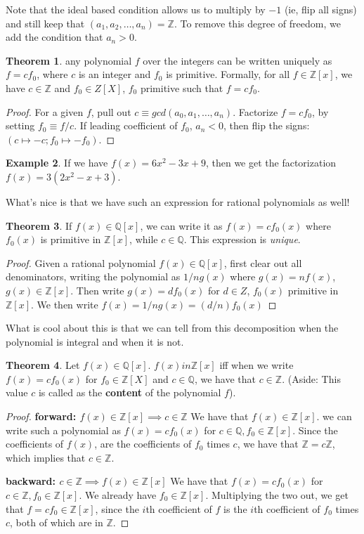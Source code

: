 \documentclass{book}
\newcommand{\Z}{\ensuremath{\mathbb{Z}}}
\newcommand{\Q}{\ensuremath{\mathbb{Q}}}
\theoremstyle{definition}
\newtheorem{theorem}{Theorem}
\newtheorem{example}[theorem]{Example}
\begin{document}
Note that the ideal based condition allows us to multiply by $-1$ (ie, flip all signs) 
and still keep that $(a_1, a_2, \dots, a_n) = \Z$. To remove this degree of
freedom, we add the condition that $a_n > 0$.

\begin{theorem}
any polynomial $f$ over the integers can be written uniquely
as $f = c f_0$, where $c$ is an integer and $f_0$ is primitive. Formally,
for all $f \in \Z[x]$, we have $c \in \Z$ and $f_0 \in Z[X]$, $f_0$ primitive
such that $f = c f_0$.
\end{theorem}
\begin{proof}
    For a given $f$, pull out $c \equiv gcd(a_0, a_1, \dots, a_n)$. Factorize
    $f = c f_0$, by setting $f_0 \equiv f / c$. If leading coefficient of
    $f_0$, $a_n < 0$, then flip the signs: $(c \mapsto -c; f_0 \mapsto -f_0)$.
\end{proof}

\begin{example}
    If we have $f(x) = 6x^2 - 3x + 9$, then we get the factorization
    $f(x) = 3(2x^2 - x + 3)$.
\end{example}

What's nice is that we have such an expression for rational polynomials
as well! 

\begin{theorem}
If $f(x) \in \Q[x]$, we can write it as $f(x) = c f_0(x)$ where
$f_0(x)$ is primitive in $\Z[x]$, while $c \in \Q$. This expression is
\emph{unique}.
\end{theorem}
\begin{proof}
    Given a rational polynomial $f(x) \in \Q[x]$, first clear out all denominators,
    writing the polynomial as $1/n g(x)$ where $g(x) = nf(x)$, $g(x) \in \Z[x]$.
    Then write $g(x) = d f_0(x)$ for $d \in Z$, $f_0(x)$ primitive in $\Z[x]$.
    We then write $f(x) = 1/n g(x) = (d/n) f_0(x)$
\end{proof}

What is cool about this is that we can tell from this decomposition when
the polynomial is integral and when it is not.
\begin{theorem}
Let $f(x) \in \Q[x]$.
$f(x)  in \Z[x]$ iff when we write $f(x) = c f_0(x)$ for $f_0 \in \Z[X]$ and $c \in \Q$, we
have that $c \in \Z$. (Aside: This value $c$ is called as the \textbf{content} 
of the polynomial $f$).
\end{theorem}
\begin{proof}
    \textbf{forward: $f(x) \in \Z[x] \implies c \in \Z$}
    We have that $f(x) \in \Z[x]$. 
    we can write such a polynomial as $f(x) = c f_0(x)$ for $c \in \Q, f_0 \in \Z[x]$.
    Since the coefficients of $f(x)$, are the
    coefficients of $f_0$ times $c$, we have that $\Z = c \Z$, which
    implies that $c \in \Z$.

    \textbf{backward: $c \in \Z \implies f(x) \in \Z[x]$}
    We have that $f(x) = c f_0(x)$ for $c \in \Z, f_0 \in \Z[x]$.
    We already have $f_0 \in \Z[x]$. Multiplying the two
    out, we get that $f = c f_0 \in \Z[x]$, since the $i$th coefficient
    of $f$ is the $i$th coefficient of $f_0$ times $c$, both of which are in $\Z$.
\end{proof}
\end{document}
